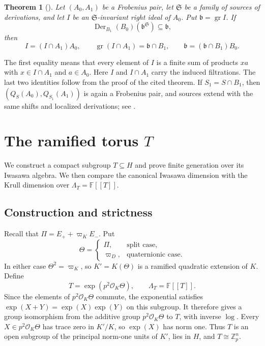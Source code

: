 \documentclass[11pt]{article}
\numberwithin{equation}{section}
\newtheorem{theorem}{Theorem}[section]
\theoremstyle{definition}
\theoremstyle{remark}
\newcommand{\F}{\mathbb F}
\newcommand{\Z}{\mathbb Z}
\newcommand{\cO}{\mathcal O}
\DeclareMathOperator{\gr}{gr}
\DeclareMathOperator{\Der}{Der}
\begin{document}
\begin{theorem}[{\cite[Thm.~3.5 and its proof]{AW09}}]
\label{thm:filtered-control}
Let $(A_0,A_1)$ be a Frobenius pair, let $\mathfrak S$ be a family of
sources of derivations, and let $I$ be an $\mathfrak S$-invariant right
ideal of $A_0$. Put $\mathfrak b=\gr I$. If
\[
 \Der_{B_1}(B_0)(\mathfrak b^{\mathfrak S})\subseteq\mathfrak b,
\]
then
\[
 I=(I\cap A_1)A_0,\qquad
 \gr(I\cap A_1)=\mathfrak b\cap B_1,\qquad
 \mathfrak b=(\mathfrak b\cap B_1)B_0.
\]
\end{theorem}

The first equality means that every element of $I$ is a finite sum
of products $xa$ with $x\in I\cap A_1$ and $a\in A_0$.
Here $I$ and $I\cap A_1$ carry the induced filtrations.
The last two identities follow from the proof of the cited theorem.
If $S_1=S\cap B_1$, then
$(Q_S(A_0),Q_{S_1}(A_1))$ is again a Frobenius pair, and sources
extend with the same shifts and localized derivations; see
\cite[Lemma~2.2 and Prop.~3.2]{AW09}.

\section{The ramified torus \texorpdfstring{$T$}{T}}
\label{sec:ramified-torus}

We construct a compact subgroup $T\subseteq H$ and prove finite
generation over its Iwasawa algebra. We then compare the canonical
Iwasawa dimension with the Krull dimension over $\Lambda_T=\F[[T]]$.

\subsection{Construction and strictness}

Recall that $\Pi=E_++\varpi_K E_-$. Put
\[
 \Theta=\begin{cases}
 \Pi,&\text{split case},\\
 \varpi_D,&\text{quaternionic case}.
 \end{cases}
\]
In either case $\Theta^2=\varpi_K$, so $K'=K(\Theta)$ is a ramified
quadratic extension of $K$. Define
\begin{equation}\label{eq:ramified-torus}
 T=\exp(p^2\cO_K\Theta),\qquad \Lambda_T=\F[[T]].
\end{equation}
Since the elements of $p^2\cO_K\Theta$ commute, the exponential
satisfies $\exp(X+Y)=\exp(X)\exp(Y)$ on this subgroup. It therefore
gives a group isomorphism from the additive group $p^2\cO_K\Theta$
to $T$, with inverse $\log$. Every $X\in p^2\cO_K\Theta$ has trace
zero in $K'/K$, so $\exp(X)$ has norm one. Thus $T$ is an open subgroup
of the principal norm-one units of $K'$, lies in $H$, and
$T\cong\Z_p^n$.
\end{document}
